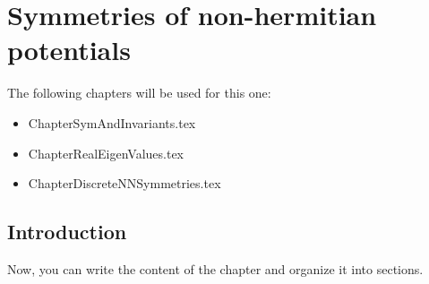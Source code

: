 
\chapter{Symmetries of non-hermitian potentials}
\label{Chapter2}

The following chapters will be used for this one:
\begin{itemize}
  \item ChapterSymAndInvariants.tex
  \item ChapterRealEigenValues.tex
  \item ChapterDiscreteNNSymmetries.tex
\end{itemize}
%
\newpage
%
\section{Introduction}

Now, you can write the content of the chapter and organize it into sections.
